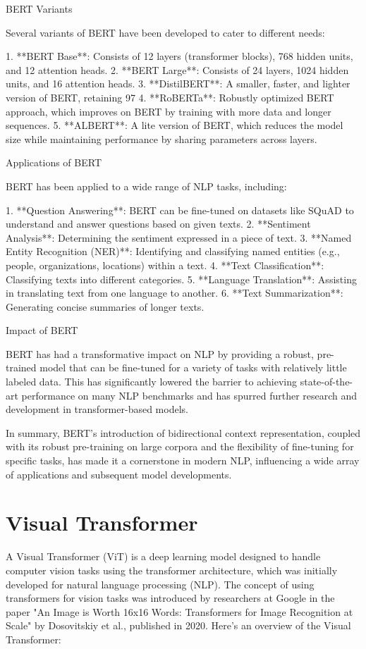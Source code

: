  BERT Variants

Several variants of BERT have been developed to cater to different needs:

1. **BERT Base**: Consists of 12 layers (transformer blocks), 768 hidden units, and 12 attention heads.
2. **BERT Large**: Consists of 24 layers, 1024 hidden units, and 16 attention heads.
3. **DistilBERT**: A smaller, faster, and lighter version of BERT, retaining 97%
4. **RoBERTa**: Robustly optimized BERT approach, which improves on BERT by training with more data and longer sequences.
5. **ALBERT**: A lite version of BERT, which reduces the model size while maintaining performance by sharing parameters across layers.

 Applications of BERT

BERT has been applied to a wide range of NLP tasks, including:

1. **Question Answering**: BERT can be fine-tuned on datasets like SQuAD to understand and answer questions based on given texts.
2. **Sentiment Analysis**: Determining the sentiment expressed in a piece of text.
3. **Named Entity Recognition (NER)**: Identifying and classifying named entities (e.g., people, organizations, locations) within a text.
4. **Text Classification**: Classifying texts into different categories.
5. **Language Translation**: Assisting in translating text from one language to another.
6. **Text Summarization**: Generating concise summaries of longer texts.

 Impact of BERT

BERT has had a transformative impact on NLP by providing a robust, pre-trained model that can be fine-tuned for a variety of tasks with relatively little labeled data. This has significantly lowered the barrier to achieving state-of-the-art performance on many NLP benchmarks and has spurred further research and development in transformer-based models.

In summary, BERT's introduction of bidirectional context representation, coupled with its robust pre-training on large corpora and the flexibility of fine-tuning for specific tasks, has made it a cornerstone in modern NLP, influencing a wide array of applications and subsequent model developments.


\section{Visual Transformer}
A Visual Transformer (ViT) is a deep learning model designed to handle computer vision tasks using the transformer architecture, which was initially developed for natural language processing (NLP). The concept of using transformers for vision tasks was introduced by researchers at Google in the paper "An Image is Worth 16x16 Words: Transformers for Image Recognition at Scale" by Dosovitskiy et al., published in 2020. Here’s an overview of the Visual Transformer:

